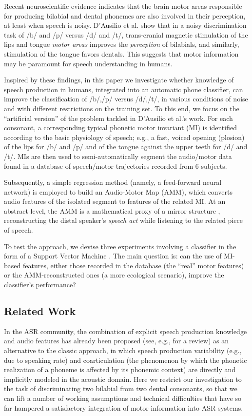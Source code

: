 \documentclass[10pt]{article}
\begin{document}
Recent neuroscientific evidence indicates that the brain motor areas responsible for
producing bilabial and dental phonemes are also involved in their perception, at least
when speech is noisy. D'Ausilio et al. \cite{dausilio}
show that in a noisy discrimination task of /b/ and /p/ versus /d/
and /t/, trans-cranial magnetic stimulation of the lips and tongue \emph{motor areas}
improves the \emph{perception} of bilabials, and similarly, stimulation of the tongue
favors dentals. This suggests that motor information may be paramount for
speech understanding in humans.

Inspired by these findings, in this paper we investigate whether knowledge of speech
production in humans, integrated into an automatic phone classifier, can improve the
classification of /b/,/p/ versus /d/,/t/, in various conditions of noise and with different
restrictions on the training set.
To this end, we focus on the ``artificial version'' of the problem tackled in D'Ausilio et al.'s
work. For each consonant, a corresponding typical phonetic motor invariant (MI) is identified
according to the basic physiology of speech; e.g., a fast, voiced opening (plosion) of the lips
for /b/ and /p/ and of the tongue against the upper teeth for /d/ and /t/.
MIs are then used to semi-automatically segment the audio/motor data found in a
database of speech/motor trajectories recorded from $6$ subjects.

Subsequently, a simple regression method (namely, a feed-forward neural network) is employed
to build an Audio-Motor Map (AMM), which converts audio features of the isolated segment to
features of the related MI. At an abstract level, the AMM is a mathematical proxy of a mirror
structure \cite{umilta-01}, reconstructing the distal speaker's \emph{speech act} while
listening to the related piece of speech.

To test the approach, we devise three experiments involving a classifier in the form of a
Support Vector Machine \cite{BGV92}. The main question is: can the use of MI-based features,
either those recorded in the database (the ``real'' motor features) or the AMM-reconstructed
ones (a more ecological scenario), improve the classifier's performance?

\subsection*{Related Work}

In the ASR community, the combination of explicit speech production knowledge and audio
features has already been proposed (see, e.g., \cite{king} for a review) as an alternative to the
classic approach, in which speech production variability (e.g., due to speaking rate) and
coarticulation (the phenomenon by which the phonetic realization of a phoneme is affected
by its phonemic context) are directly and implicitly modeled in the acoustic domain.
Here we restrict our investigation to the task of discriminating two bilabial from two
dental consonants, so that we can lift a number of working assumptions and technical
difficulties that have so far hampered a satisfactory integration of motor information
into ASR systems.
\end{document}
